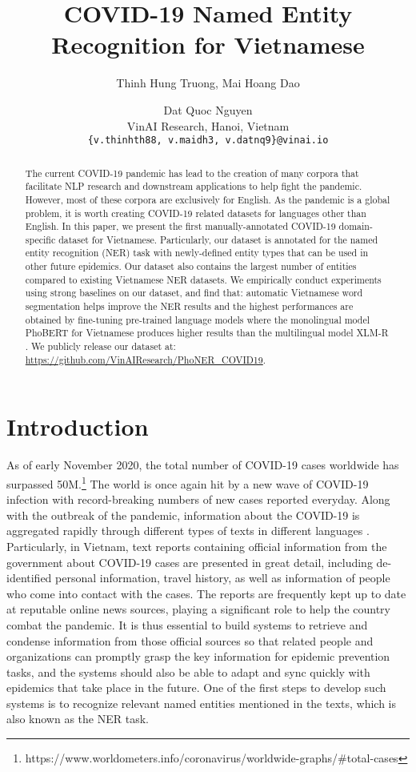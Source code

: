 \documentclass[11pt]{article}
\title{COVID-19 Named Entity Recognition for Vietnamese}
\author{Thinh Hung Truong, Mai Hoang Dao \and Dat Quoc Nguyen \\
        VinAI Research, Hanoi, Vietnam\\
        \normalsize{\texttt{\{v.thinhth88, v.maidh3, v.datnq9\}@vinai.io}}
        }
\begin{document}
\maketitle

\begin{abstract}
The current COVID-19 pandemic has lead to the creation of many corpora that facilitate NLP research and downstream applications to help fight the pandemic. However, most of these corpora are exclusively for English. As the pandemic is a global problem, it is worth creating COVID-19 related datasets for languages other than English. In this paper, we present the first manually-annotated COVID-19 domain-specific dataset for Vietnamese. Particularly, our dataset is annotated for the named entity recognition (NER) task with newly-defined entity types that can be used in other future epidemics. Our dataset also contains the largest number of entities compared to existing Vietnamese NER datasets. We empirically conduct experiments using strong baselines on our dataset, and find that: automatic Vietnamese word segmentation helps improve the NER results and the highest performances are obtained by fine-tuning pre-trained language models where  the monolingual model PhoBERT for Vietnamese \cite{nguyen2020phobert} produces higher results than the multilingual model XLM-R \cite{conneau2019unsupervised}. We publicly release our dataset at:  \url{https://github.com/VinAIResearch/PhoNER_COVID19}. 
\end{abstract}



\section{Introduction}
\label{intro}



As of early November 2020, the total number of COVID-19 cases worldwide has surpassed 50M.\footnote{https://www.worldometers.info/coronavirus/worldwide-graphs/\#total-cases} The world is once again hit by a new wave of COVID-19 infection with record-breaking numbers of new cases reported everyday. Along with the outbreak of the pandemic, information about the COVID-19 is aggregated rapidly through different types of texts in different languages \cite{aizawa2020system}.
Particularly, in Vietnam, text reports containing official information from the government about COVID-19 cases are presented in great detail, including de-identified personal information, travel history, as well as information of people who come into contact with the cases. The reports are frequently kept up to date at reputable online news sources, playing a significant role to help the country combat the pandemic. 
It is thus essential to build systems to retrieve and condense information from those official sources so that related people and organizations can promptly grasp the key information for epidemic prevention tasks, and the systems should also be able to adapt and sync quickly with epidemics that take place in the future.
One of the first steps to develop such systems is to recognize relevant named entities mentioned in the texts,  which is also known as the NER task.
\end{document}
